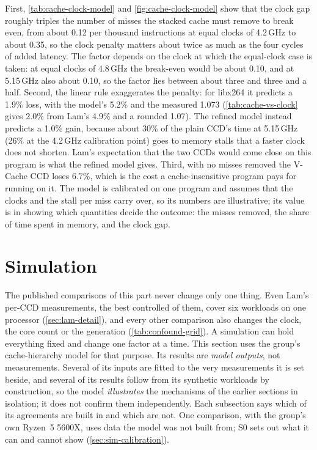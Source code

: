First, \cref{tab:cache-clock-model} and \cref{fig:cache-clock-model} show that the clock gap roughly triples the number of misses the stacked cache must remove to break even, from about 0.12 per thousand instructions at equal clocks of 4.2\,GHz to about 0.35, so the clock penalty matters about twice as much as the four cycles of added latency. The factor depends on the clock at which the equal-clock case is taken: at equal clocks of 4.8\,GHz the break-even would be about 0.10, and at 5.15\,GHz also about 0.10, so the factor lies between about three and three and a half. Second, the linear rule exaggerates the penalty: for libx264 it predicts a 1.9\% loss, with the model's 5.2\% and the measured 1.073 (\cref{tab:cache-vs-clock} gives 2.0\% from Lam's 4.9\% and a rounded 1.07). The refined model instead predicts a 1.0\% gain, because about 30\% of the plain CCD's time at 5.15\,GHz (26\% at the 4.2\,GHz calibration point) goes to memory stalls that a faster clock does not shorten. Lam's expectation that the two CCDs would come close on this program \cite{lamAMDs7950X3DZen2023} is what the refined model gives. Third, with no misses removed the V-Cache CCD loses 6.7\%, which is the cost a cache-insensitive program pays for running on it. The model is calibrated on one program and assumes that the clocks and the stall per miss carry over, so its numbers are illustrative; its value is in showing which quantities decide the outcome: the misses removed, the share of time spent in memory, and the clock gap.

\section{Simulation}
\label{sec:sim-study}
The published comparisons of this part never change only one thing. Even Lam's per-CCD measurements, the best controlled of them, cover six workloads on one processor (\cref{sec:lam-detail}), and every other comparison also changes the clock, the core count or the generation (\cref{tab:confound-grid}). A simulation can hold everything fixed and change one factor at a time. This section uses the group's cache-hierarchy model for that purpose. Its results are \emph{model outputs}, not measurements. Several of its inputs are fitted to the very measurements it is set beside, and several of its results follow from its synthetic workloads by construction, so the model \emph{illustrates} the mechanisms of the earlier sections in isolation; it does not confirm them independently. Each subsection says which of its agreements are built in and which are not. One comparison, with the group's own Ryzen~5 5600X, uses data the model was not built from; S0 sets out what it can and cannot show (\cref{sec:sim-calibration}).

